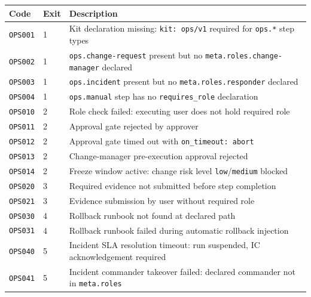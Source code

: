 \begin{center}
\small
\begin{tabular}{llp{7.5cm}}
\textbf{Code} & \textbf{Exit} & \textbf{Description} \\
\hline
\texttt{OPS001} & 1 & Kit declaration missing: \texttt{kit: ops/v1} required for \texttt{ops.*} step types \\
\texttt{OPS002} & 1 & \texttt{ops.change-request} present but no \texttt{meta.roles.change-manager} declared \\
\texttt{OPS003} & 1 & \texttt{ops.incident} present but no \texttt{meta.roles.responder} declared \\
\texttt{OPS004} & 1 & \texttt{ops.manual} step has no \texttt{requires\_role} declaration \\
\texttt{OPS010} & 2 & Role check failed: executing user does not hold required role \\
\texttt{OPS011} & 2 & Approval gate rejected by approver \\
\texttt{OPS012} & 2 & Approval gate timed out with \texttt{on\_timeout: abort} \\
\texttt{OPS013} & 2 & Change-manager pre-execution approval rejected \\
\texttt{OPS014} & 2 & Freeze window active: change risk level \texttt{low}/\texttt{medium} blocked \\
\texttt{OPS020} & 3 & Required evidence not submitted before step completion \\
\texttt{OPS021} & 3 & Evidence submission by user without required role \\
\texttt{OPS030} & 4 & Rollback runbook not found at declared path \\
\texttt{OPS031} & 4 & Rollback runbook failed during automatic rollback injection \\
\texttt{OPS040} & 5 & Incident SLA resolution timeout: run suspended, IC acknowledgement required \\
\texttt{OPS041} & 5 & Incident commander takeover failed: declared commander not in \texttt{meta.roles} \\
\end{tabular}
\end{center}
